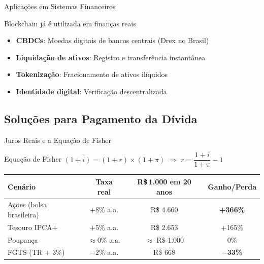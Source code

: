 \documentclass{libs/ufc_format}
\begin{document}
\begin{frame}{Aplicações em Sistemas Financeiros}
    \begin{block}{Blockchain já é utilizada em finanças reais}
        \begin{itemize}
            \item \textbf{CBDCs}: Moedas digitais de bancos centrais (Drex no Brasil)
            \item \textbf{Liquidação de ativos}: Registro e transferência instantânea
            \item \textbf{Tokenização}: Fracionamento de ativos ilíquidos
            \item \textbf{Identidade digital}: Verificação descentralizada
        \end{itemize}
    \end{block}

    \vspace{0.3cm}

\end{frame}

\subsection{Soluções para Pagamento da Dívida}
\begin{frame}{Juros Reais e a Equação de Fisher}
    \begin{block}{Equação de Fisher}
        $(1 + i) = (1 + r) \times (1 + \pi)$ \quad $\Rightarrow$ \quad $r = \dfrac{1 + i}{1 + \pi} - 1$
    \end{block}

    \vspace{0.2cm}

    \begin{table}
        \centering
        \small
        \begin{tabular}{lccc}
            \toprule
            \textbf{Cenário} & \textbf{Taxa real} & \textbf{R\$\,1.000 em 20 anos} & \textbf{Ganho/Perda} \\
            \midrule
            Ações (bolsa brasileira) & +8\% a.a. & R\$ 4.660 & \textbf{+366\%} \\
            Tesouro IPCA+ & +5\% a.a. & R\$ 2.653 & +165\% \\
            Poupança & $\approx$0\% a.a. & $\approx$ R\$ 1.000 & 0\% \\
            FGTS (TR + 3\%) & $-$2\% a.a. & R\$ 668 & \textbf{$-$33\%} \\
            \bottomrule
        \end{tabular}
    \end{table}

    \vspace{0.1cm}

\end{frame}
\end{document}
